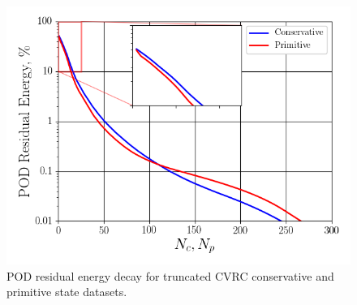 \begin{figure}
	\centering
	\includegraphics[width=0.8\linewidth]{Chapters/CavityAndCVRC/Images/cvrc/cvrc_pod_energy_0p5ms.png}
	\caption{\label{fig:cvrcPODEnergy}POD residual energy decay for truncated CVRC conservative and primitive state datasets.}
\end{figure}

